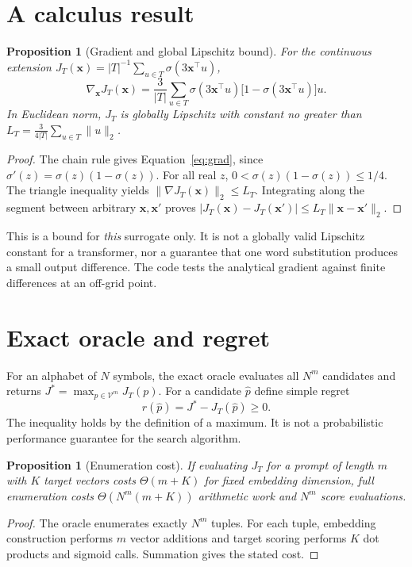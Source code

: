 \documentclass[12pt,a4paper,oneside]{report}
\newtheorem{proposition}[theorem]{Proposition}
\newcommand{\Vocab}{\mathcal V}
\newcommand{\sig}{\sigma}
\begin{document}
\section{A calculus result}
\begin{proposition}[Gradient and global Lipschitz bound]
For the continuous extension $J_T(\mathbf x)=|T|^{-1}\sum_{u\in T}\sig(3\mathbf x^\top u)$,
\begin{equation}
\nabla_{\mathbf x}J_T(\mathbf x)=\frac{3}{|T|}\sum_{u\in T}\sig(3\mathbf x^\top u)\bigl[1-\sig(3\mathbf x^\top u)\bigr]u.
\label{eq:grad}
\end{equation}
In Euclidean norm, $J_T$ is globally Lipschitz with constant no greater than $L_T=\frac{3}{4|T|}\sum_{u\in T}\|u\|_2$.
\end{proposition}
\begin{proof}
The chain rule gives Equation~\eqref{eq:grad}, since $\sig'(z)=\sig(z)(1-\sig(z))$. For all real $z$, $0<\sig(z)(1-\sig(z))\le 1/4$. The triangle inequality yields $\|\nabla J_T(\mathbf x)\|_2\le L_T$. Integrating along the segment between arbitrary $\mathbf x,\mathbf x'$ proves $|J_T(\mathbf x)-J_T(\mathbf x')|\le L_T\|\mathbf x-\mathbf x'\|_2$.
\end{proof}
This is a bound for \emph{this} surrogate only. It is not a globally valid Lipschitz constant for a transformer, nor a guarantee that one word substitution produces a small output difference. The code tests the analytical gradient against finite differences at an off-grid point.

\section{Exact oracle and regret}
For an alphabet of $N$ symbols, the exact oracle evaluates all $N^m$ candidates and returns $J^*=\max_{p\in\Vocab^m}J_T(p)$. For a candidate $\hat p$ define simple regret
\begin{equation}r(\hat p)=J^*-J_T(\hat p)\ge0.\label{eq:regret}\end{equation}
The inequality holds by the definition of a maximum. It is not a probabilistic performance guarantee for the search algorithm.

\begin{proposition}[Enumeration cost]
If evaluating $J_T$ for a prompt of length $m$ with $K$ target vectors costs $\Theta(m+K)$ for fixed embedding dimension, full enumeration costs $\Theta(N^m(m+K))$ arithmetic work and $N^m$ score evaluations.
\end{proposition}
\begin{proof}
The oracle enumerates exactly $N^m$ tuples. For each tuple, embedding construction performs $m$ vector additions and target scoring performs $K$ dot products and sigmoid calls. Summation gives the stated cost.
\end{proof}
\end{document}
